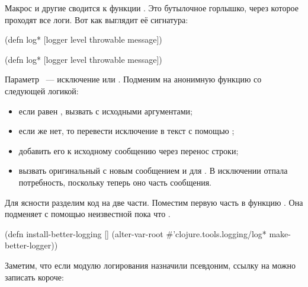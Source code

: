
Макрос  и другие сводится к функции . Это
бутылочное горлышко, через которое проходят все логи. Вот как выглядит её
сигнатура:

\ifnarrow

\begin{clojure}
(defn log*
  [logger level throwable message])
\end{clojure}

\else

\begin{clojure}
(defn log* [logger level throwable message])
\end{clojure}

\fi

Параметр ~--- исключение или . Подменим  на
анонимную функцию со следующей логикой:

\begin{itemize}

\item
  если  равен , вызвать  с исходными
  аргументами;

\item
  если же нет, то перевести исключение в текст с помощью ;

\item
  добавить его к исходному сообщению через перенос строки;

\item
  вызвать оригинальный  с новым сообщением и  для
  . В исключении отпала потребность, поскольку теперь оно
  часть сообщения.

\end{itemize}

Для ясности разделим код на две части. Поместим первую часть в функцию
. Она подменяет  с помощью неизвестной
пока что .

\begin{clojure}
(defn install-better-logging []
  (alter-var-root
   #'clojure.tools.logging/log*
   make-better-logger))
\end{clojure}

Заметим, что если модулю логирования назначили псевдоним, ссылку на 
можно записать короче:


\ifnarrow

